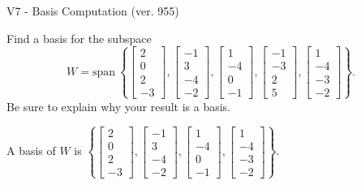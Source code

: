 \begin{exercise}
  \begin{exerciseTitle}V7 - Basis Computation (ver. 955)\end{exerciseTitle}
  \begin{exerciseStatement}
    Find a basis for the subspace 
\[W=\mathrm{span}\ \left\{\left[\begin{array}{r}
2 \\
0 \\
2 \\
-3
\end{array}\right] , \left[\begin{array}{r}
-1 \\
3 \\
-4 \\
-2
\end{array}\right] , \left[\begin{array}{r}
1 \\
-4 \\
0 \\
-1
\end{array}\right] , \left[\begin{array}{r}
-1 \\
-3 \\
2 \\
5
\end{array}\right] , \left[\begin{array}{r}
1 \\
-4 \\
-3 \\
-2
\end{array}\right]\right\}.\]
 Be sure to explain why your result is a basis.


  \end{exerciseStatement}
  \begin{exerciseAnswer}
   A basis of \(W\) is  \(\left\{\left[\begin{array}{r}
2 \\
0 \\
2 \\
-3
\end{array}\right] , \left[\begin{array}{r}
-1 \\
3 \\
-4 \\
-2
\end{array}\right] , \left[\begin{array}{r}
1 \\
-4 \\
0 \\
-1
\end{array}\right] , \left[\begin{array}{r}
1 \\
-4 \\
-3 \\
-2
\end{array}\right]\right\}\).
  


  \end{exerciseAnswer}
\end{exercise}